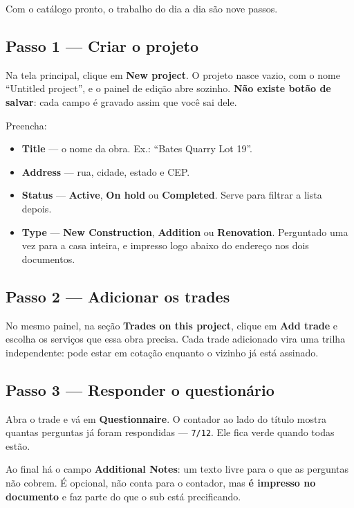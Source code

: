 \documentclass[11pt,a4paper]{article}
\newcommand{\ui}[1]{\textbf{\textsf{#1}}}
\begin{document}
Com o catálogo pronto, o trabalho do dia a dia são nove passos.

\subsection{Passo 1 — Criar o projeto}

Na tela principal, clique em \ui{New project}. O projeto nasce vazio, com o nome
``Untitled project'', e o painel de edição abre sozinho. \textbf{Não existe botão
de salvar}: cada campo é gravado assim que você sai dele.

Preencha:

\begin{itemize}
  \item \ui{Title} — o nome da obra. Ex.: ``Bates Quarry Lot 19''.
  \item \ui{Address} — rua, cidade, estado e CEP.
  \item \ui{Status} — \ui{Active}, \ui{On hold} ou \ui{Completed}. Serve para
  filtrar a lista depois.
  \item \ui{Type} — \ui{New Construction}, \ui{Addition} ou \ui{Renovation}.
  Perguntado uma vez para a casa inteira, e impresso logo abaixo do endereço nos
  dois documentos.
\end{itemize}

\subsection{Passo 2 — Adicionar os trades}

No mesmo painel, na seção \ui{Trades on this project}, clique em \ui{Add trade} e
escolha os serviços que essa obra precisa. Cada trade adicionado vira uma trilha
independente: pode estar em cotação enquanto o vizinho já está assinado.

\subsection{Passo 3 — Responder o questionário}

Abra o trade e vá em \ui{Questionnaire}. O contador ao lado do título mostra
quantas perguntas já foram respondidas — \texttt{7/12}. Ele fica verde quando
todas estão.

Ao final há o campo \ui{Additional Notes}: um texto livre para o que as perguntas
não cobrem. É opcional, não conta para o contador, mas \textbf{é impresso no
documento} e faz parte do que o sub está precificando.
\end{document}
